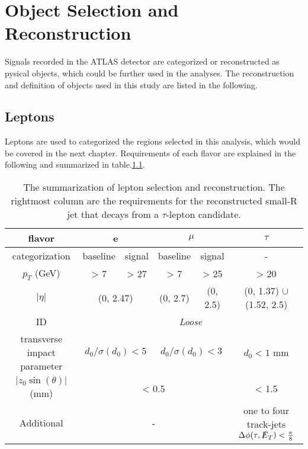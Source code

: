 \documentclass[class=NCU_thesis, crop=false]{standalone}
\begin{document}
\chapter{Object Selection and Reconstruction}
	Signals recorded in the ATLAS detector are categorized or reconstructed as pysical objects, which could be further used in the analyses. The reconstruction and definition of objects used in this study are listed in the following.
	
\section{Leptons}
	Leptons are used to categorized the regions selected in this analysis, which would be covered in the next chapter. Requirements of each flavor are explained in the following and summarized in table.\ref{tab:lepton selection}.
	
	\begin{table}[h]
	\caption{The summarization of lepton selection and reconstruction. The rightmost column are the requirements for the reconstructed small-R jet that decays from a $\tau$-lepton candidate.}
	\label{tab:lepton selection}		\begin{tabular}{|c|c|c|c|c|c|}
		\hline
		flavor & \multicolumn{2}{c|}{e} & \multicolumn{2}{c|}{$\mu$} & $\tau$ \\ \hline
		categorization & baseline & signal & baseline & signal & - \\ \hline
		$p_T$ (GeV) & > 7 & > 27 & > 7 & > 25 & > 20 \\ \hline
		$\lvert \eta \rvert$ & \multicolumn{2}{c|}{(0, 2.47)} & (0, 2.7) & (0, 2.5) & (0, 1.37) $\cup$ (1.52, 2.5) \\ \hline
		ID & \multicolumn{5}{c|}{\textit{Loose}} \\ \hline
		transverse impact parameter & \multicolumn{2}{c|}{$d_0 / \sigma(d_0) < 5$} & \multicolumn{2}{c|}{$d_0 / \sigma(d_0) < 3$} & $d_0 < 1$ mm \\ \hline
		$\lvert z_0 \sin(\theta) \rvert$ (mm) & \multicolumn{4}{c|}{< 0.5} & < 1.5 \\ \hline
		Additional & \multicolumn{4}{c|}{-} & \shortstack{one to four track-jets\\$\Delta \phi(\tau, \slashed{E}_T) < \frac{\pi}{8}$}\\ \hline
		\end{tabular}
	\end{table}
\end{document}
